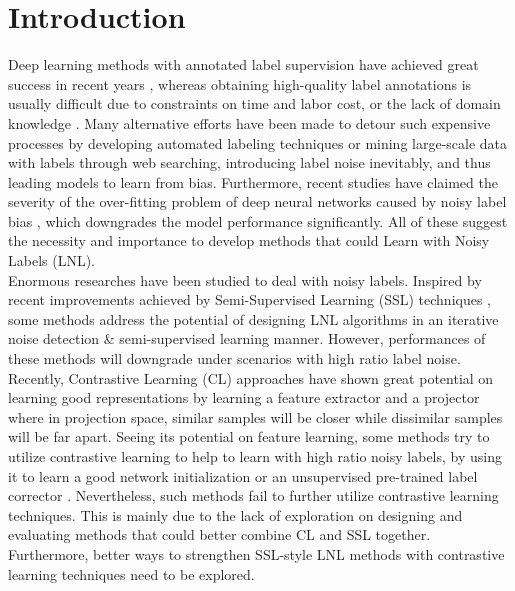 \documentclass[letterpaper]{article} \usepackage{aaai22}  \usepackage{times}  \usepackage{helvet}  \usepackage{courier}  \usepackage[hyphens]{url}  \usepackage{graphicx} \usepackage{subfigure}
\begin{document}
\section{Introduction}
Deep learning methods with annotated label supervision have achieved great success in recent years \cite{he2016deep,tan2019efficientnet}, whereas obtaining high-quality label annotations is usually difficult due to constraints on time and labor cost, or the lack of domain knowledge \cite{cheplygina2019not}. Many alternative efforts have been made to detour such expensive processes by developing automated labeling techniques or mining large-scale data with labels through web searching, introducing label noise inevitably, and thus leading models to learn from bias. Furthermore, recent studies have claimed the severity of the over-fitting problem of deep neural networks caused by noisy label bias \cite{zhang2016understanding}, which downgrades the model performance significantly. All of these suggest the necessity and importance to develop methods that could Learn with Noisy Labels (LNL).\\
Enormous researches have been studied to deal with noisy labels. Inspired by recent improvements achieved by Semi-Supervised Learning (SSL) techniques \cite{berthelot2019mixmatch,berthelot2019remixmatch,sohn2020fixmatch}, some methods \cite{arazo2019unsupervised,li2020dividemix} address the potential of designing LNL algorithms in an iterative noise detection \& semi-supervised learning manner. However, performances of these methods will downgrade under scenarios with high ratio label noise. Recently, Contrastive Learning (CL) approaches \cite{chen2020simple,he2020momentum,chen2020big,chen2020improved} have shown great potential on learning good representations by learning a feature extractor and a projector where in projection space, similar samples will be closer while dissimilar samples will be far apart. Seeing its potential on feature learning, some methods try to utilize contrastive learning to help to learn with high ratio noisy labels, by using it to learn a good network initialization \cite{zheltonozhskii2021contrast} or an unsupervised pre-trained label corrector \cite{zhang2020decoupling}. Nevertheless, such methods fail to further utilize contrastive learning techniques. This is mainly due to the lack of exploration on designing and evaluating methods that could better combine CL and SSL together. Furthermore, better ways to strengthen SSL-style LNL methods with contrastive learning techniques need to be explored. \\
\end{document}
